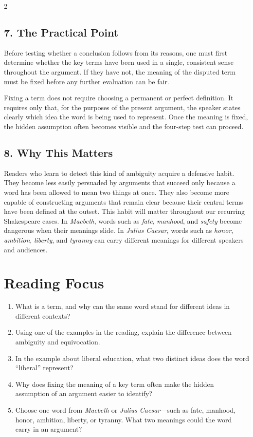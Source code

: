 \documentclass[12pt]{article}
\begin{document}
\begin{multicols}{2}
\subsection*{7. The Practical Point}
Before testing whether a conclusion follows from its reasons, one must first determine whether the key terms have been used in a single, consistent sense throughout the argument. If they have not, the meaning of the disputed term must be fixed before any further evaluation can be fair.

Fixing a term does not require choosing a permanent or perfect definition. It requires only that, for the purposes of the present argument, the speaker states clearly which idea the word is being used to represent. Once the meaning is fixed, the hidden assumption often becomes visible and the four-step test can proceed.

\subsection*{8. Why This Matters}
Readers who learn to detect this kind of ambiguity acquire a defensive habit. They become less easily persuaded by arguments that succeed only because a word has been allowed to mean two things at once. They also become more capable of constructing arguments that remain clear because their central terms have been defined at the outset. This habit will matter throughout our recurring Shakespeare cases. In \textit{Macbeth}, words such as \textit{fate}, \textit{manhood}, and \textit{safety} become dangerous when their meanings slide. In \textit{Julius Caesar}, words such as \textit{honor}, \textit{ambition}, \textit{liberty}, and \textit{tyranny} can carry different meanings for different speakers and audiences.

\section*{Reading Focus}
\begin{enumerate}[leftmargin=*]
\item What is a term, and why can the same word stand for different ideas in different contexts?
\item Using one of the examples in the reading, explain the difference between ambiguity and equivocation.
\item In the example about liberal education, what two distinct ideas does the word “liberal” represent?
\item Why does fixing the meaning of a key term often make the hidden assumption of an argument easier to identify?
\item Choose one word from \textit{Macbeth} or \textit{Julius Caesar}---such as fate, manhood, honor, ambition, liberty, or tyranny. What two meanings could the word carry in an argument?
\end{enumerate}


\end{multicols}
\end{document}
